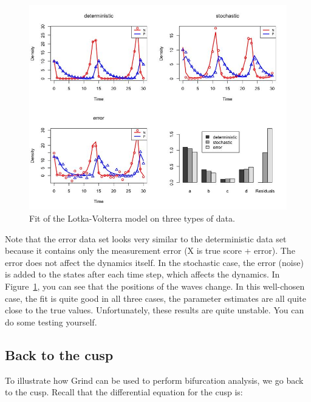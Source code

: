 \documentclass[
  letterpaper,
]{scrbook}
\begin{document}
\begin{figure}

{\centering \includegraphics[width=5.47222in,height=\textheight]{media/ch5/image1.jpg}

}

\caption{\label{fig-ch5-img1-old-49}Fit of the Lotka-Volterra model on
three types of data.}

\end{figure}

Note that the error data set looks very similar to the deterministic
data set because it contains only the measurement error (X is true score
+ error). The error does not affect the dynamics itself. In the
stochastic case, the error (noise) is added to the states after each
time step, which affects the dynamics. In
Figure~\ref{fig-ch5-img1-old-49}, you can see that the positions of the
waves change. In this well-chosen case, the fit is quite good in all
three cases, the parameter estimates are all quite close to the true
values. Unfortunately, these results are quite unstable. You can do some
testing yourself.

\hypertarget{back-to-the-cusp}{%
\subsection{Back to the cusp}\label{back-to-the-cusp}}

To illustrate how Grind can be used to perform bifurcation analysis, we
go back to the cusp. Recall that the differential equation for the cusp
is:
\end{document}
